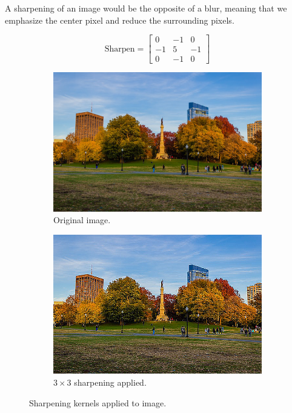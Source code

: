 \documentclass{article}
\begin{document}
    \begin{example}[Sharpening]
      A sharpening of an image would be the opposite of a blur, meaning that we emphasize the center pixel and reduce the surrounding pixels. 

      \[\text{Sharpen} = \begin{bmatrix} 0 & -1 & 0 \\ -1 & 5 & -1 \\ 0 & -1 & 0 \end{bmatrix}\]

      \begin{figure}[H]
        \centering
        \begin{subfigure}[b]{0.45\textwidth} 
        \centering
            \includegraphics[width=\textwidth]{img/Park_Full.png}
            \caption{Original image. }
            \label{fig:Park_Full_def}
        \end{subfigure}
        \begin{subfigure}[b]{0.45\textwidth}
        \centering
            \includegraphics[width=\textwidth]{img/Sharpen.png}
            \caption{$3 \times 3$ sharpening applied. }
            \label{fig:Sharpen}
        \end{subfigure}

        \label{fig:sharpen}
        \caption{Sharpening kernels applied to image. }
      \end{figure}
    \end{example}
\end{document}
